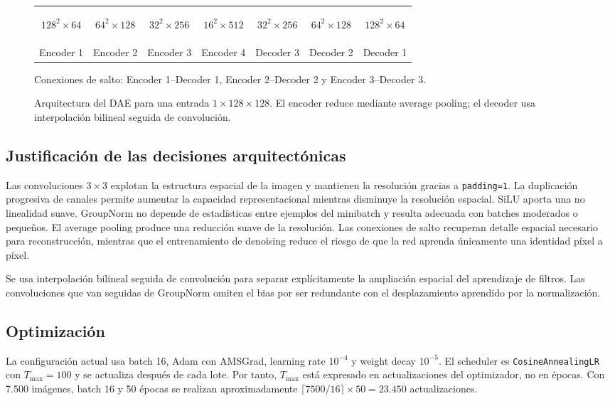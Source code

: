 \documentclass[10pt,a4paper,twocolumn]{article}
\begin{document}
\begin{figure}[t]
\centering
\small
\setlength{\tabcolsep}{5pt}
\begin{tabular}{c@{ $\rightarrow$ }c@{ $\rightarrow$ }c@{ $\rightarrow$ }c@{ $\rightarrow$ }c@{ $\rightarrow$ }c@{ $\rightarrow$ }c}
\colorbox{blue!10}{\strut $128^2\!\times64$} &
\colorbox{blue!10}{\strut $64^2\!\times128$} &
\colorbox{blue!10}{\strut $32^2\!\times256$} &
\colorbox{blue!18}{\strut $16^2\!\times512$} &
\colorbox{green!12}{\strut $32^2\!\times256$} &
\colorbox{green!12}{\strut $64^2\!\times128$} &
\colorbox{green!12}{\strut $128^2\!\times64$} \\
Encoder 1 & Encoder 2 & Encoder 3 & Encoder 4 & Decoder 3 & Decoder 2 & Decoder 1
\end{tabular}

\vspace{0.4em}
\textcolor{blue!70!black}{Conexiones de salto: Encoder 1--Decoder 1,
Encoder 2--Decoder 2 y Encoder 3--Decoder 3.}
\caption{Arquitectura del DAE para una entrada $1\times128\times128$. El
encoder reduce mediante average pooling; el decoder usa interpolación bilineal
seguida de convolución.}
\label{fig:dae-arch}
\end{figure}

\subsection{Justificación de las decisiones arquitectónicas}
Las convoluciones $3\times3$ explotan la estructura espacial de la imagen y
mantienen la resolución gracias a \texttt{padding=1}. La duplicación progresiva
de canales permite aumentar la capacidad representacional mientras disminuye la
resolución espacial. SiLU aporta una no linealidad suave. GroupNorm no depende
de estadísticas entre ejemplos del minibatch y resulta adecuada con batches
moderados o pequeños. El average pooling produce una reducción suave de la
resolución. Las conexiones de salto recuperan detalle espacial necesario para
reconstrucción, mientras que el entrenamiento de denoising reduce el riesgo de
que la red aprenda únicamente una identidad píxel a píxel.

Se usa interpolación bilineal seguida de convolución para separar explícitamente
la ampliación espacial del aprendizaje de filtros. Las convoluciones que van
seguidas de GroupNorm omiten el bias por ser redundante con el desplazamiento
aprendido por la normalización.

\subsection{Optimización}
La configuración actual usa batch 16, Adam con AMSGrad, learning rate
$10^{-4}$ y weight decay $10^{-5}$. El scheduler es
\texttt{CosineAnnealingLR} con $T_{\max}=100$ y se actualiza después de cada
lote. Por tanto, $T_{\max}$ está expresado en actualizaciones del optimizador, no
en épocas. Con 7.500 imágenes, batch 16 y 50 épocas se realizan aproximadamente
$\lceil7500/16\rceil\times50=23.450$ actualizaciones.
\end{document}
